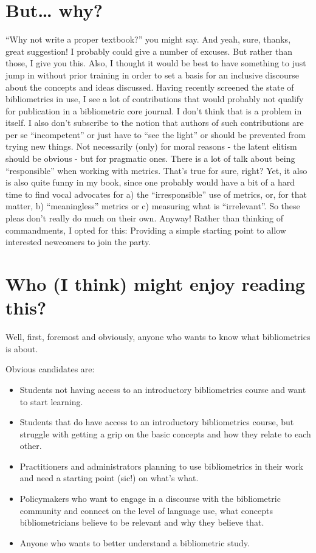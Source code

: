 \documentclass[
  letterpaper,
]{scrreprt}
\providecommand{\tightlist}{%
  \setlength{\itemsep}{0pt}\setlength{\parskip}{0pt}}
\begin{document}
\section{But\ldots{} why?}\label{but-why}

``Why not write a proper textbook?'' you might say. And yeah, sure,
thanks, great suggestion! I probably could give a number of excuses. But
rather than those, I give you this. Also, I thought it would be best to
have something to just jump in without prior training in order to set a
basis for an inclusive discourse about the concepts and ideas discussed.
Having recently screened the state of bibliometrics in use, I see a lot
of contributions that would probably not qualify for publication in a
bibliometric core journal. I don't think that is a problem in itself. I
also don't subscribe to the notion that authors of such contributions
are per se ``incompetent'' or just have to ``see the light'' or should
be prevented from trying new things. Not necessarily (only) for moral
reasons - the latent elitism should be obvious - but for pragmatic ones.
There is a lot of talk about being ``responsible'' when working with
metrics. That's true for sure, right? Yet, it also is also quite funny
in my book, since one probably would have a bit of a hard time to find
vocal advocates for a) the ``irresponsible'' use of metrics, or, for
that matter, b) ``meaningless'' metrics or c) measuring what is
``irrelevant''. So these pleas don't really do much on their own.
Anyway! Rather than thinking of commandments, I opted for this:
Providing a simple starting point to allow interested newcomers to join
the party.

\section{Who (I think) might enjoy reading
this?}\label{who-i-think-might-enjoy-reading-this}

Well, first, foremost and obviously, anyone who wants to know what
bibliometrics is about.

Obvious candidates are:

\begin{itemize}
\tightlist
\item
  Students not having access to an introductory bibliometrics course and
  want to start learning.
\item
  Students that do have access to an introductory bibliometrics course,
  but struggle with getting a grip on the basic concepts and how they
  relate to each other.
\item
  Practitioners and administrators planning to use bibliometrics in
  their work and need a starting point (sic!) on what's what.
\item
  Policymakers who want to engage in a discourse with the bibliometric
  community and connect on the level of language use, what concepts
  bibliometricians believe to be relevant and why they believe that.
\item
  Anyone who wants to better understand a bibliometric study.
\end{itemize}
\end{document}

